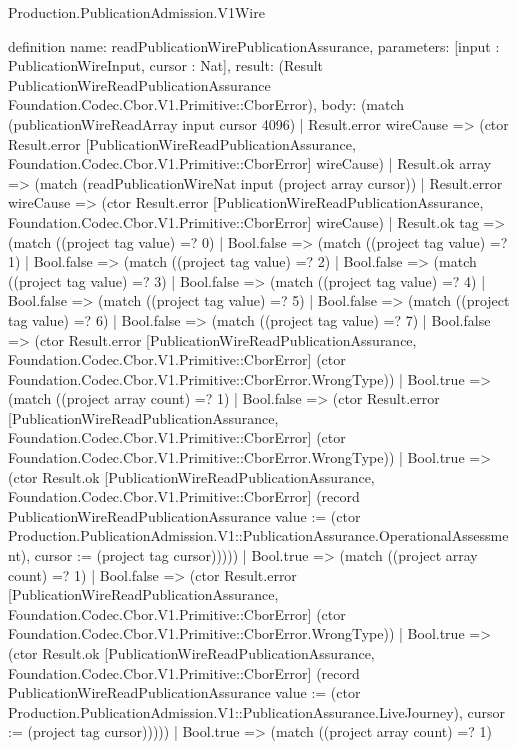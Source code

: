 \begin{lexlean}{Production.PublicationAdmission.V1Wire}
\begin{semanticmodule}
definition{
  name: readPublicationWirePublicationAssurance,
  parameters: [input : PublicationWireInput, cursor : Nat],
  result: (Result PublicationWireReadPublicationAssurance Foundation.Codec.Cbor.V1.Primitive::CborError),
  body: (match (publicationWireReadArray input cursor 4096)
    | Result.error wireCause => (ctor Result.error [PublicationWireReadPublicationAssurance, Foundation.Codec.Cbor.V1.Primitive::CborError] wireCause)
    | Result.ok array => (match (readPublicationWireNat input (project array cursor))
      | Result.error wireCause => (ctor Result.error [PublicationWireReadPublicationAssurance, Foundation.Codec.Cbor.V1.Primitive::CborError] wireCause)
      | Result.ok tag => (match ((project tag value) =? 0)
        | Bool.false => (match ((project tag value) =? 1)
          | Bool.false => (match ((project tag value) =? 2)
            | Bool.false => (match ((project tag value) =? 3)
              | Bool.false => (match ((project tag value) =? 4)
                | Bool.false => (match ((project tag value) =? 5)
                  | Bool.false => (match ((project tag value) =? 6)
                    | Bool.false => (match ((project tag value) =? 7)
                      | Bool.false => (ctor Result.error [PublicationWireReadPublicationAssurance, Foundation.Codec.Cbor.V1.Primitive::CborError] (ctor Foundation.Codec.Cbor.V1.Primitive::CborError.WrongType))
                      | Bool.true => (match ((project array count) =? 1)
                        | Bool.false => (ctor Result.error [PublicationWireReadPublicationAssurance, Foundation.Codec.Cbor.V1.Primitive::CborError] (ctor Foundation.Codec.Cbor.V1.Primitive::CborError.WrongType))
                        | Bool.true => (ctor Result.ok [PublicationWireReadPublicationAssurance, Foundation.Codec.Cbor.V1.Primitive::CborError] (record PublicationWireReadPublicationAssurance {value := (ctor Production.PublicationAdmission.V1::PublicationAssurance.OperationalAssessment), cursor := (project tag cursor)}))))
                    | Bool.true => (match ((project array count) =? 1)
                      | Bool.false => (ctor Result.error [PublicationWireReadPublicationAssurance, Foundation.Codec.Cbor.V1.Primitive::CborError] (ctor Foundation.Codec.Cbor.V1.Primitive::CborError.WrongType))
                      | Bool.true => (ctor Result.ok [PublicationWireReadPublicationAssurance, Foundation.Codec.Cbor.V1.Primitive::CborError] (record PublicationWireReadPublicationAssurance {value := (ctor Production.PublicationAdmission.V1::PublicationAssurance.LiveJourney), cursor := (project tag cursor)}))))
                  | Bool.true => (match ((project array count) =? 1)
}
\end{semanticmodule}
\end{lexlean}
